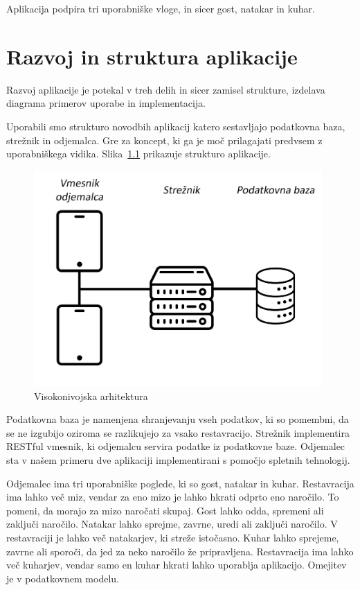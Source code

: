 \documentclass[a4paper, 12pt]{book}
\begin{document}
Aplikacija podpira tri uporabniške vloge, in sicer gost, natakar in kuhar. 

\chapter{Razvoj in struktura aplikacije}

Razvoj aplikacije je potekal v treh delih in sicer zamisel strukture, izdelava diagrama primerov uporabe in implementacija.

Uporabili smo strukturo novodbih aplikacij katero sestavljajo podatkovna baza, strežnik in odjemalca. Gre za koncept, ki ga je moč prilagajati predvsem z uporabniškega vidika. Slika~\ref{StrukApk} prikazuje strukturo aplikacije.

\begin{figure}[!htb]
\centering
\includegraphics[width=11cm]{Skica1.png}
\caption{Visokonivojska arhitektura}
\label{StrukApk}
\end{figure}

Podatkovna baza je namenjena shranjevanju vseh podatkov, ki so pomembni, da se ne izgubijo oziroma se razlikujejo za vsako restavracijo. 
Strežnik implementira RESTful vmesnik, ki odjemalcu servira podatke iz podatkovne baze. Odjemalec sta v našem primeru dve aplikaciji implementirani s pomočjo spletnih tehnologij.

Odjemalec ima tri uporabniške poglede, ki so gost, natakar in kuhar. Restavracija ima lahko več miz, vendar za eno mizo je lahko hkrati odprto eno naročilo. To pomeni, da morajo za mizo naročati skupaj. Gost lahko odda, spremeni ali zaključi naročilo. 
Natakar lahko sprejme, zavrne, uredi ali zaključi naročilo.  V restavraciji je lahko več natakarjev, ki streže istočasno.  Kuhar lahko sprejeme, zavrne ali sporoči, da jed za neko naročilo že pripravljena. Restavracija ima lahko več kuharjev, vendar samo en kuhar hkrati lahko uporablja aplikacijo. Omejitev je v podatkovnem modelu.
\end{document}
